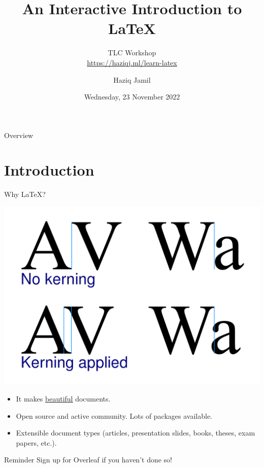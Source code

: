 \documentclass[,aspectratio=43]{beamer}
\author{Haziq Jamil}
\title{An Interactive Introduction to \LaTeX}
\subtitle{TLC Workshop\\
\url{https://haziqj.ml/learn-latex}}
\institute{Mathematical Sciences, Faculty of Science, UBD}
\date{Wednesday, 23 November 2022}
\begin{document}
\begin{frame}
	\titlepage
\end{frame}

\begin{frame}[allowframebreaks=0.8]{Overview}
    \begin{multicols}{2}
  \tableofcontents
  \end{multicols}
  \end{frame}


\hypertarget{introduction}{%
\section{Introduction}\label{introduction}}

\begin{frame}{Why \LaTeX?}
\protect\hypertarget{why}{}
\vspace{-0.5em}

\begin{center}\includegraphics[width=1\linewidth,height=0.5\textheight]{figure/kerning} \end{center}

\vspace{-0.5em}

\begin{itemize}
\item
  It makes \href{https://nitens.org/w/latex/}{\underline{beautiful}}
  documents.
\item
  Open source and active community. Lots of packages available.
\item
  Extensible document types (articles, presentation slides, books,
  theses, exam papers, etc.).
\end{itemize}

\begin{alertblock}{Reminder}
Sign up for Overleaf if you haven't done so!

\end{alertblock}
\end{frame}
\end{document}
